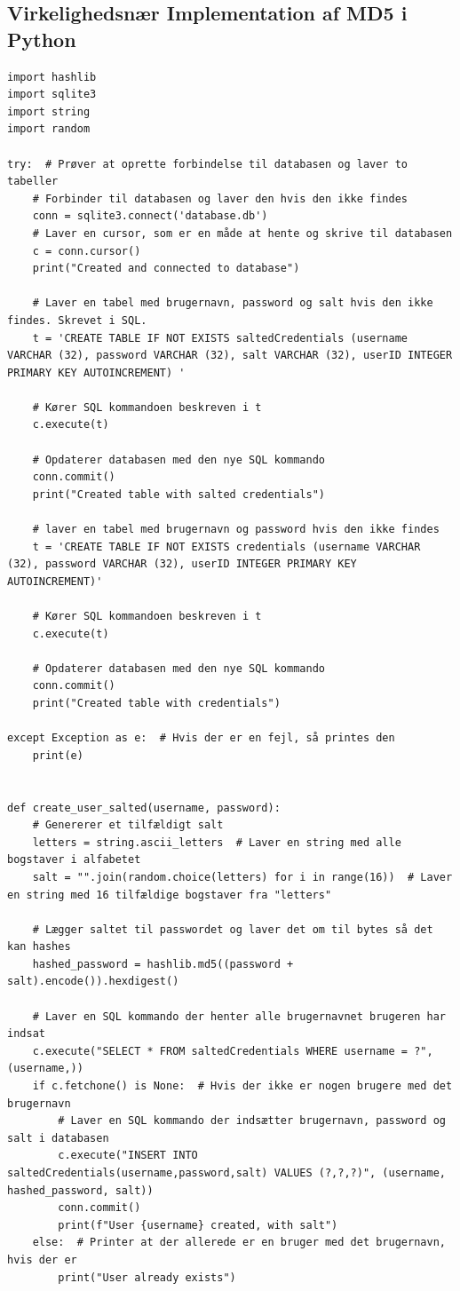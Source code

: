 \documentclass[12pt]{article}
\begin{document}
\subsection{Virkelighedsnær Implementation af MD5 i Python}
\begin{verbatim}
import hashlib
import sqlite3
import string
import random

try:  # Prøver at oprette forbindelse til databasen og laver to tabeller
    # Forbinder til databasen og laver den hvis den ikke findes
    conn = sqlite3.connect('database.db')
    # Laver en cursor, som er en måde at hente og skrive til databasen
    c = conn.cursor()
    print("Created and connected to database")

    # Laver en tabel med brugernavn, password og salt hvis den ikke findes. Skrevet i SQL.
    t = 'CREATE TABLE IF NOT EXISTS saltedCredentials (username VARCHAR (32), password VARCHAR (32), salt VARCHAR (32), userID INTEGER PRIMARY KEY AUTOINCREMENT) '

    # Kører SQL kommandoen beskreven i t
    c.execute(t)

    # Opdaterer databasen med den nye SQL kommando
    conn.commit()
    print("Created table with salted credentials")

    # laver en tabel med brugernavn og password hvis den ikke findes
    t = 'CREATE TABLE IF NOT EXISTS credentials (username VARCHAR (32), password VARCHAR (32), userID INTEGER PRIMARY KEY AUTOINCREMENT)'

    # Kører SQL kommandoen beskreven i t
    c.execute(t)

    # Opdaterer databasen med den nye SQL kommando
    conn.commit()
    print("Created table with credentials")

except Exception as e:  # Hvis der er en fejl, så printes den
    print(e)


def create_user_salted(username, password):
    # Genererer et tilfældigt salt
    letters = string.ascii_letters  # Laver en string med alle bogstaver i alfabetet
    salt = "".join(random.choice(letters) for i in range(16))  # Laver en string med 16 tilfældige bogstaver fra "letters"

    # Lægger saltet til passwordet og laver det om til bytes så det kan hashes
    hashed_password = hashlib.md5((password + salt).encode()).hexdigest()

    # Laver en SQL kommando der henter alle brugernavnet brugeren har indsat
    c.execute("SELECT * FROM saltedCredentials WHERE username = ?", (username,))
    if c.fetchone() is None:  # Hvis der ikke er nogen brugere med det brugernavn
        # Laver en SQL kommando der indsætter brugernavn, password og salt i databasen
        c.execute("INSERT INTO saltedCredentials(username,password,salt) VALUES (?,?,?)", (username, hashed_password, salt))
        conn.commit()
        print(f"User {username} created, with salt")
    else:  # Printer at der allerede er en bruger med det brugernavn, hvis der er
        print("User already exists")



\end{verbatim}
\end{document}
